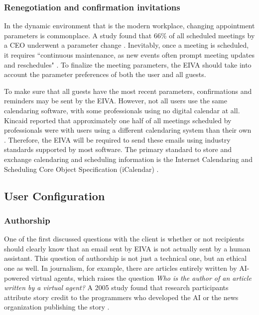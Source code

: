 \documentclass{article}
\begin{document}
\subsubsection{Renegotiation and confirmation invitations}

In the dynamic environment that is the modern workplace, changing appointment parameters is commonplace. A study found that 66\% of all scheduled meetings by a CEO underwent a parameter change \cite{dennis_how_2018}. Inevitably, once a meeting is scheduled, it requires ``continuous maintenance, as new events often prompt meeting updates and reschedules" \cite{cranshaw_calendar.help:_2017}. To finalize the meeting parameters, the EIVA should take into account the parameter preferences of both the user and all guests.

To make sure that all guests have the most recent parameters, confirmations and reminders may be sent by the EIVA. However, not all users use the same calendaring software, with some professionals using no digital calendar at all. Kincaid reported that approximately one half of all meetings scheduled by professionals were with users using a different calendaring system than their own \cite{kincaid_electronic_1985}. Therefore, the EIVA will be required to send these emails using industry standards supported by most software. The primary standard to store and exchange calendaring and scheduling information is the Internet Calendaring and Scheduling Core Object Specification (iCalendar) \cite{desruisseaux_internet_2009}.

\subsection{User Configuration}

\subsubsection{Authorship}

One of the first discussed questions with the client is whether or not recipients should clearly know that an email sent by EIVA is not actually sent by a human assistant. This question of authorship is not just a technical one, but an ethical one as well. In journalism, for example, there are articles entirely written by AI-powered virtual agents, which raises the question \emph{Who is the author of an article written by a virtual agent?} A 2005 study found that research participants attribute story credit to the programmers who developed the AI or the news organization publishing the story \cite{montal_i_2017}.
\end{document}
